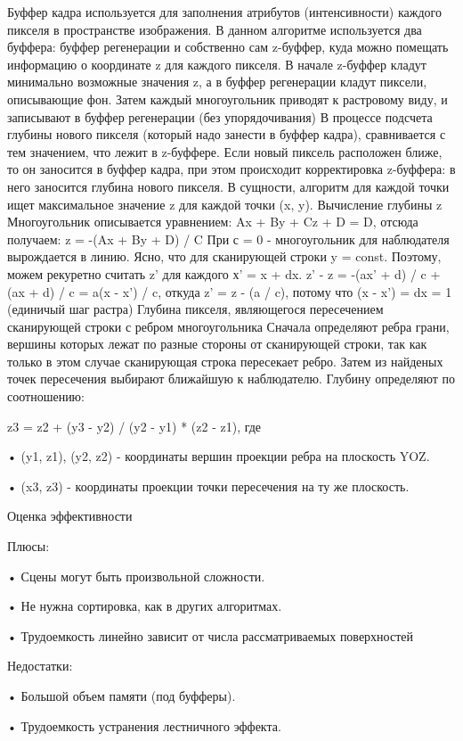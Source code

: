 Буффер кадра используется для заполнения атрибутов (интенсивности) каждого пикселя в пространстве изображения.
 В данном алгоритме используется два буффера: буффер регенерации и собственно сам z-буффер, куда можно помещать информацию о координате z для каждого пикселя.
В начале z-буффер кладут минимально возможные значения z, а в буффер регенерации кладут пиксели, описывающие фон.
 Затем каждый многоугольник приводят к растровому виду, и записывают в буффер регенерации (без упорядочивания)
В процессе подсчета глубины нового пикселя (который надо занести в буффер кадра), сравнивается с тем значением, что лежит в z-буффере. Если новый пиксель расположен ближе, то он заносится в буффер кадра, при этом происходит корректировка z-буффера: в него заносится глубина нового пикселя. В сущности, алгоритм для каждой точки ищет максимальное значение z для каждой точки (x, y).
Вычисление глубины z
Многоугольник описывается уравнением: Ax + By + Cz + D = D, отсюда получаем:
 z = -(Ax + By + D) / C При с = 0 - многоугольник для наблюдателя вырождается в линию.
 Ясно, что для сканирующей строки y = const. Поэтому, можем рекуретно считать z' для каждого х' = x + dx.
z' - z = -(ax' + d) / c + (ax + d) / c = a(x - x') / c, откуда z' = z - (a / c), потому что (x - x') = dx = 1 (единичый шаг растра)
Глубина пикселя, являющегося пересечением сканирующей строки с ребром многоугольника
Сначала определяют ребра грани, вершины которых лежат по разные стороны от сканирующей строки, так как только в этом случае сканирующая строка пересекает ребро. Затем из найденых точек пересечения выбирают ближайшую к наблюдателю.
Глубину определяют по соотношению:

z3 = z2 + (y3 - y2) / (y2 - y1) * (z2 - z1), где
    
    • (y1, z1), (y2, z2) - координаты вершин проекции ребра на плоскость YOZ.
    
    • (x3, z3) - координаты проекции точки пересечения на ту же плоскость.

Оценка эффективности

Плюсы:

    • Сцены могут быть произвольной сложности.
    
    • Не нужна сортировка, как в других алгоритмах.
    
    • Трудоемкость линейно зависит от числа рассматриваемых поверхностей
    
Недостатки:

    • Большой объем памяти (под буфферы).
    
    • Трудоемкость устранения лестничного эффекта.
    
